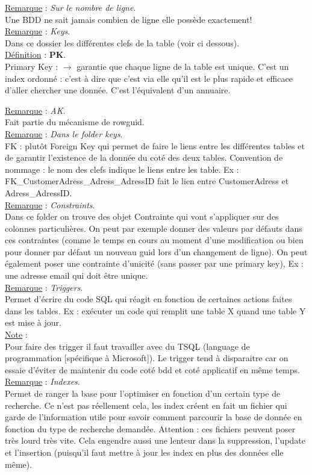 \documentclass[a4paper,12pt,twoside]{article}
\newcommand{\rem}[2]{\noindent\underline{Remarque} : \textit{#1}.\\ \indent #2}
\newcommand{\note}[1]{\noindent\underline{Note} : \\ \indent #1}
\newcommand{\defi}[2]{\noindent\underline{Définition} : \textbf{#1}.\\ \indent #2}
\begin{document}
\rem{Sur le nombre de ligne}{Une BDD ne sait jamais combien de ligne elle possède exactement!}\\

\rem{Keys}{Dans ce dossier les différentes clefs de la table (voir ci dessous).}\\

\defi{PK}{Primary Key : $\to$ garantie que chaque ligne de la table est unique. C'est un index ordonné : c'est à dire que c'est via elle qu'il est le plus rapide et efficace d'aller chercher une donnée. C'est l'équivalent d'un annuaire.}

\rem{AK}{Fait partie du mécanisme de rowguid.}\\

\rem{Dans le folder keys}{FK : plutôt Foreign Key qui permet de faire le liens entre les différentes tables et de garantir l'existence de la donnée du coté des deux tables. Convention de nommage : le nom des clefs indique le liens entre les table. Ex : FK_CustomerAdress_Adress_AdressID fait le lien entre CustomerAdress et Adress_AdressID.}\\

\rem{Constraints}{Dans ce folder on trouve des objet Contrainte qui vont s'appliquer sur des colonnes particulières. On peut par exemple donner des valeurs par défauts dans ces contraintes (comme le temps en cours au moment d'une modification ou bien pour donner par défaut un nouveau guid lors d'un changement de ligne). On peut également poser une contrainte d'unicité (sans passer par une primary key), Ex : une adresse email qui doit être unique.}\\

\rem{Triggers}{Permet d'écrire du code SQL qui réagit en fonction de certaines actions faites dans les tables. Ex : exécuter un code qui remplit une table X quand une table Y est mise à jour.}\\

\note{Pour faire des trigger il faut travailler avec du TSQL (language de programmation [spécifique à Microsoft]). Le trigger tend à disparaitre car on essaie d'éviter de maintenir du code coté bdd et coté applicatif en même temps.}\\

\rem{Indexes}{Permet de ranger la base pour l'optimiser en fonction d'un certain type de recherche. Ce n'est pas réellement cela, les index créent en fait un fichier qui garde de l'information utile pour savoir comment parcourir la base de donnée en fonction du type de recherche demandée. Attention : ces fichiers peuvent poser très lourd très vite. Cela engendre aussi une lenteur dans la suppression, l'update et l'insertion (puisqu'il faut mettre à jour les index en plus des données elle même).}\\
\end{document}
